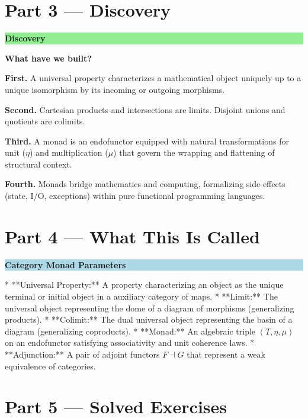 \documentclass[12pt, a4paper]{article}
\newenvironment{discoverybox}
  {\par\medskip\fillcolorbox{LightGreen}{DiscoveryColor}{Discovery}}
  {\par\medskip}
\newenvironment{namedconcept}[1]
  {\par\medskip\fillcolorbox{LightBlue}{NavyBlue}{#1}}
  {\par\medskip}
\newcommand{\fillcolorbox}[3]{%
  \noindent
  \filldrawbox{#1}{#2}{\textbf{\sffamily\color{white}#3}}\par\nobreak\vspace{4pt}
}
\newcommand{\filldrawbox}[3]{%
  \colorbox{#1}{\parbox{\dimexpr\linewidth-2\fboxsep\relax}{%
    \vspace{4pt}\noindent\hspace{4pt}#3\vspace{4pt}%
  }}%
}
\begin{document}
\section{Part 3 --- Discovery}

\begin{discoverybox}
\textbf{What have we built?}

\textbf{First.} A universal property characterizes a mathematical object uniquely up to a unique isomorphism by its incoming or outgoing morphisms.

\textbf{Second.} Cartesian products and intersections are limits. Disjoint unions and quotients are colimits.

\textbf{Third.} A monad is an endofunctor equipped with natural transformations for unit ($\eta$) and multiplication ($\mu$) that govern the wrapping and flattening of structural context.

\textbf{Fourth.} Monads bridge mathematics and computing, formalizing side-effects (state, I/O, exceptions) within pure functional programming languages.
\end{discoverybox}

\newpage

\section{Part 4 --- What This Is Called}

\begin{namedconcept}{Category Monad Parameters}
* **Universal Property:** A property characterizing an object as the unique terminal or initial object in a auxiliary category of maps.
* **Limit:** The universal object representing the dome of a diagram of morphisms (generalizing products).
* **Colimit:** The dual universal object representing the basin of a diagram (generalizing coproducts).
* **Monad:** An algebraic triple $(T, \eta, \mu)$ on an endofunctor satisfying associativity and unit coherence laws.
* **Adjunction:** A pair of adjoint functors $F \dashv G$ that represent a weak equivalence of categories.
\end{namedconcept}

\newpage

\section{Part 5 --- Solved Exercises}
\end{document}
